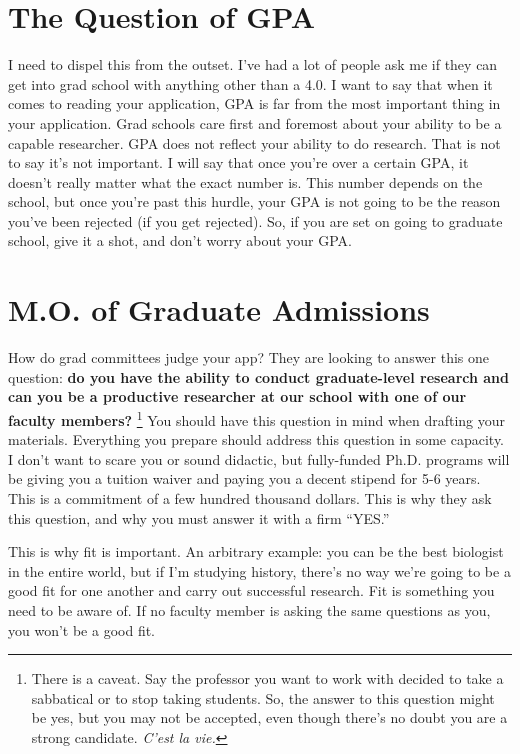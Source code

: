 \documentclass[12pt]{article}
\begin{document}
\section{The Question of GPA}
I need to dispel this from the outset. I've had a lot of people ask me if they can get into grad school with anything other than a 4.0. I want to say that when it comes to reading your application, GPA is far from the most important thing in your application. Grad schools care first and foremost about your ability to be a capable researcher. GPA does not reflect your ability to do research. That is not to say it's not important. I will say that once you're over a certain GPA, it doesn't really matter what the exact number is. This number depends on the school, but once you're past this hurdle, your GPA is not going to be the reason you've been rejected (if you get rejected). So, if you are set on going to graduate school, give it a shot, and don't worry about your GPA.

\section{M.O. of Graduate Admissions}
How do grad committees judge your app? They are looking to answer this one question: \textbf{do you have the ability to conduct graduate-level research and can you be a productive researcher at our school with one of our faculty members?} \footnote{There is a caveat. Say the professor you want to work with decided to take a sabbatical or to stop taking students. So, the answer to this question might be yes, but you may not be accepted, even though there's no doubt you are a strong candidate. \textit{C'est la vie.}} You should have this question in mind when drafting your materials. Everything you prepare should address this question in some capacity. I don't want to scare you or sound didactic, but fully-funded Ph.D. programs will be giving you a tuition waiver and paying you a decent stipend for 5-6 years. This is a commitment of a few hundred thousand dollars. This is why they ask this question, and why you must answer it with a firm ``YES.''

This is why fit is important. An arbitrary example: you can be the best biologist in the entire world, but if I'm studying history, there's no way we're going to be a good fit for one another and carry out successful research. Fit is something you need to be aware of. If no faculty member is asking the same questions as you, you won't be a good fit.
\end{document}

